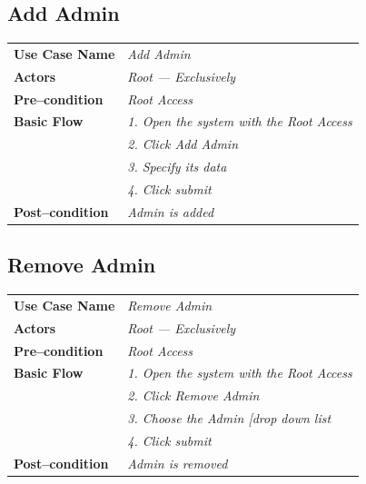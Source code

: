 \documentclass{article}
\begin{document}
\subsection{Add Admin}
    \begin{tabular}{ l | l }
    \toprule
      \rowcolor{LightCyan}
      \textbf{Use Case Name}    & \textit{Add Admin}\\
      \textbf{Actors}           & \textit{Root --- Exclusively}\\
      \rowcolor{LightCyan}
      \textbf{Pre--condition}   & \textit{Root Access}\\
      \textbf{Basic Flow}       & \textit{1. Open the system with the Root Access}\\
                                & \textit{2. Click Add Admin}\\
                                & \textit{3. Specify its data}\\
                                & \textit{4. Click submit}\\
      \rowcolor{LightCyan}
      \textbf{Post--condition}  & \textit{Admin is added}\\
    \toprule
    \end{tabular}



\subsection{Remove Admin}
    \begin{tabular}{ l | l }
    \toprule
      \rowcolor{LightCyan}
      \textbf{Use Case Name}    & \textit{Remove Admin}\\
      \textbf{Actors}           & \textit{Root --- Exclusively}\\
      \rowcolor{LightCyan}
      \textbf{Pre--condition}   & \textit{Root Access}\\
      \textbf{Basic Flow}       & \textit{1. Open the system with the Root Access}\\
                                & \textit{2. Click Remove Admin}\\
                                & \textit{3. Choose the Admin [drop down list}\\
                                & \textit{4. Click submit}\\
      \rowcolor{LightCyan}
      \textbf{Post--condition}  & \textit{Admin is removed}\\
    \toprule
    \end{tabular}
\end{document}
